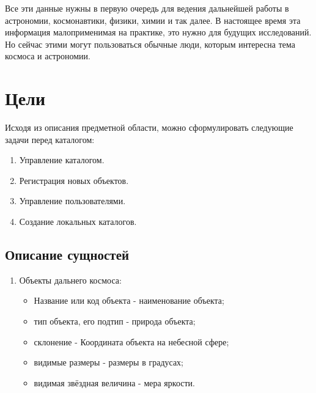 \documentclass[14pt]{extreport}
\begin{document}
{        Все эти данные нужны в первую очередь для ведения дальнейшей работы в астрономии, космонавтики, физики, химии и так далее. В настоящее время эта информация малоприменимая на практике, это нужно для будущих исследований. Но сейчас этими могут пользоваться обычные люди, которым интересна тема космоса и астрономии.

        \newpage

        \section{Цели}

        Исходя из описания предметной области, можно сформулировать следующие задачи перед каталогом:

        \begin{enumerate}
        \item Управление каталогом.

        \item Регистрация новых объектов.

        \item Управление пользователями.

        \item Создание локальных каталогов.
        \end{enumerate}

        \subsection{Описание сущностей}

        \begin{enumerate}
        
        \item Объекты дальнего космоса:

        \begin{itemize}
            \item Название или код объекта - наименование объекта;
        
            \item тип объекта, его подтип - природа объекта;
            
            \item склонение - Координата объекта на небесной сфере;  
            
            \item видимые размеры - размеры в градусах;
            
            \item видимая звёздная величина - мера яркости.
        \end{itemize}


\end{enumerate}}
\end{document}

